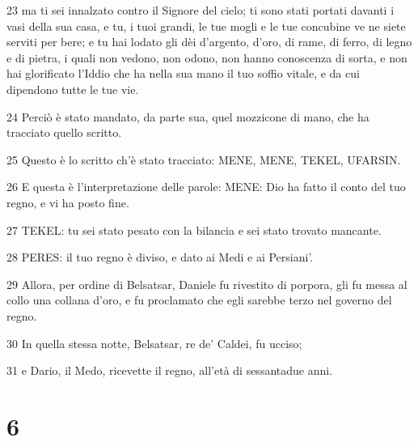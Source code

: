 \par 23 ma ti sei innalzato contro il Signore del cielo; ti sono stati portati davanti i vasi della sua casa, e tu, i tuoi grandi, le tue mogli e le tue concubine ve ne siete serviti per bere; e tu hai lodato gli dèi d'argento, d'oro, di rame, di ferro, di legno e di pietra, i quali non vedono, non odono, non hanno conoscenza di sorta, e non hai glorificato l'Iddio che ha nella sua mano il tuo soffio vitale, e da cui dipendono tutte le tue vie.
\par 24 Perciò è stato mandato, da parte sua, quel mozzicone di mano, che ha tracciato quello scritto.
\par 25 Questo è lo scritto ch'è stato tracciato: MENE, MENE, TEKEL, UFARSIN.
\par 26 E questa è l'interpretazione delle parole: MENE: Dio ha fatto il conto del tuo regno, e vi ha posto fine.
\par 27 TEKEL: tu sei stato pesato con la bilancia e sei stato trovato mancante.
\par 28 PERES: il tuo regno è diviso, e dato ai Medi e ai Persiani'.
\par 29 Allora, per ordine di Belsatsar, Daniele fu rivestito di porpora, gli fu messa al collo una collana d'oro, e fu proclamato che egli sarebbe terzo nel governo del regno.
\par 30 In quella stessa notte, Belsatsar, re de' Caldei, fu ucciso;
\par 31 e Dario, il Medo, ricevette il regno, all'età di sessantadue anni.

\chapter{6}

